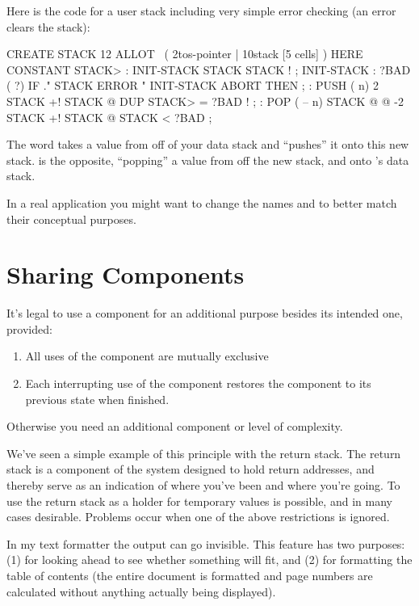 Here is the code for a user stack including very simple error checking
(an error clears the stack):

\begin{Code}
CREATE STACK  12 ALLOT  \  ( 2tos-pointer | 10stack [5 cells] )
HERE CONSTANT STACK>
: INIT-STACK   STACK STACK ! ;   INIT-STACK
: ?BAD  ( ?)   IF ." STACK ERROR "  INIT-STACK  ABORT  THEN ;
: PUSH  ( n)   2 STACK +!  STACK @  DUP  STACK> = ?BAD  ! ;
: POP  ( -- n)  STACK @ @  -2 STACK +!  STACK @ STACK < ?BAD ;
\end{Code}
The word  takes a value from off of your data stack and ``pushes''
it onto this new stack.  is the opposite, ``popping'' a value from off
the new stack, and onto \Forth{}'s data stack.

In a real application you might want to change the names 
and  to better match their conceptual purposes.

\section{Sharing Components}
\begin{tip}
It's legal to use a component for an additional purpose besides its intended
one, provided:

\begin{enumerate}
\item All uses of the component are mutually exclusive
\item Each interrupting use of the component restores the component to
   its previous state when finished.
\end{enumerate}

Otherwise you need an additional component or level of complexity.
\end{tip}
We've seen a simple example of this principle with the return stack. The
return stack is a component of the \Forth{} system designed to hold
return addresses, and thereby serve as an indication of where you've been
and where you're going. To use the return stack as a holder for temporary
values is possible, and in many cases desirable. Problems occur when one
of the above restrictions is ignored.

In my text formatter the output can go invisible. This feature has
two purposes: (1) for looking ahead to see whether something will fit, and
(2) for formatting the table of contents (the entire document is formatted
and page numbers are calculated without anything actually being
displayed).

